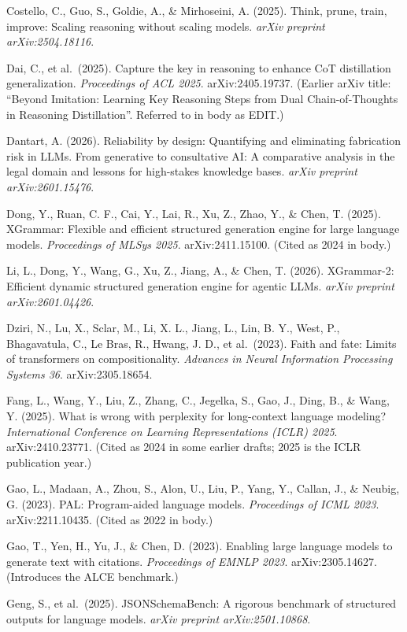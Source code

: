 \documentclass[
]{article}
\begin{document}
Costello, C., Guo, S., Goldie, A., \& Mirhoseini, A. (2025). Think,
prune, train, improve: Scaling reasoning without scaling models.
\emph{arXiv preprint arXiv:2504.18116}.

Dai, C., et al.~(2025). Capture the key in reasoning to enhance CoT
distillation generalization. \emph{Proceedings of ACL 2025}.
arXiv:2405.19737. (Earlier arXiv title: ``Beyond Imitation: Learning Key
Reasoning Steps from Dual Chain-of-Thoughts in Reasoning Distillation''.
Referred to in body as EDIT.)

Dantart, A. (2026). Reliability by design: Quantifying and eliminating
fabrication risk in LLMs. From generative to consultative AI: A
comparative analysis in the legal domain and lessons for high-stakes
knowledge bases. \emph{arXiv preprint arXiv:2601.15476}.

Dong, Y., Ruan, C. F., Cai, Y., Lai, R., Xu, Z., Zhao, Y., \& Chen, T.
(2025). XGrammar: Flexible and efficient structured generation engine
for large language models. \emph{Proceedings of MLSys 2025}.
arXiv:2411.15100. (Cited as 2024 in body.)

Li, L., Dong, Y., Wang, G., Xu, Z., Jiang, A., \& Chen, T. (2026).
XGrammar-2: Efficient dynamic structured generation engine for agentic
LLMs. \emph{arXiv preprint arXiv:2601.04426}.

Dziri, N., Lu, X., Sclar, M., Li, X. L., Jiang, L., Lin, B. Y., West,
P., Bhagavatula, C., Le Bras, R., Hwang, J. D., et al.~(2023). Faith and
fate: Limits of transformers on compositionality. \emph{Advances in
Neural Information Processing Systems 36}. arXiv:2305.18654.

Fang, L., Wang, Y., Liu, Z., Zhang, C., Jegelka, S., Gao, J., Ding, B.,
\& Wang, Y. (2025). What is wrong with perplexity for long-context
language modeling? \emph{International Conference on Learning
Representations (ICLR) 2025}. arXiv:2410.23771. (Cited as 2024 in some
earlier drafts; 2025 is the ICLR publication year.)

Gao, L., Madaan, A., Zhou, S., Alon, U., Liu, P., Yang, Y., Callan, J.,
\& Neubig, G. (2023). PAL: Program-aided language models.
\emph{Proceedings of ICML 2023}. arXiv:2211.10435. (Cited as 2022 in
body.)

Gao, T., Yen, H., Yu, J., \& Chen, D. (2023). Enabling large language
models to generate text with citations. \emph{Proceedings of EMNLP
2023}. arXiv:2305.14627. (Introduces the ALCE benchmark.)

Geng, S., et al.~(2025). JSONSchemaBench: A rigorous benchmark of
structured outputs for language models. \emph{arXiv preprint
arXiv:2501.10868}.
\end{document}
